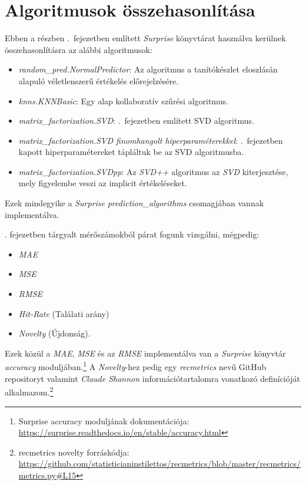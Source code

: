 \documentclass[
]{thesis-ekf}
\theoremstyle{definition}
\theoremstyle{remark}
\begin{document}
\section{Algoritmusok összehasonlítása}
\label{sec-algoritmusok-osszehasonlitasa}
Ebben a részben .~fejezetben említett \emph{Surprise} könyvtárat használva kerülnek összehasonlításra az alábbi algoritmusok: 
\begin{itemize}
	\item \emph{random\_pred.NormalPredictor}: Az algoritmus a tanítókészlet eloszlásán alapuló véletlenszerű értékelés előrejelzésére.
	\item \emph{knns.KNNBasic}: Egy alap kollaboratív szűrési algoritmus.
	\item \emph{matrix\_factorization.SVD}: .~fejezetben említett SVD algoritmus.
	\item \emph{matrix\_factorization.SVD finomhangolt hiperparaméterekkel}: .~fejezetben kapott hiperparamétereket tápláltuk be az SVD algoritmusba.
	\item \emph{matrix\_factorization.SVDpp}: Az \emph{SVD++} algoritmus az \emph{SVD} kiterjesztése, mely figyelembe veszi az implicit értékeléseket.
\end{itemize}
Ezek mindegyike a \emph{Surprise} \emph{prediction\_algorithms} csomagjában vannak implementálva.\cite{surpriselib_docs:prediction_algorithms}

. fejezetben tárgyalt mérőszámokból párat fogunk vizsgálni, mégpedig:
\begin{itemize}
	\item \emph{MAE}
	\item \emph{MSE}
	\item \emph{RMSE}
	\item \emph{Hit-Rate} (Találati arány)
	\item \emph{Novelty} (Újdonság).
\end{itemize}
Ezek közül a \emph{MAE}, \emph{MSE} és az \emph{RMSE} implementálva van a \emph{Surprise} könyvtár \emph{accuracy} moduljában.\footnote{Surprise accuracy moduljának dokumentációja: \url{https://surprise.readthedocs.io/en/stable/accuracy.html}} A \emph{Novelty}-hez pedig egy \emph{recmetrics} nevű GitHub repositoryt valamint \emph{Claude Shannon} információtartalomra vonatkozó definícióját \cite{wiki-self-information} alkalmazom.\footnote{recmetrics novelty forráskódja: \url{https://github.com/statisticianinstilettos/recmetrics/blob/master/recmetrics/metrics.py\#L15}}
\end{document}
